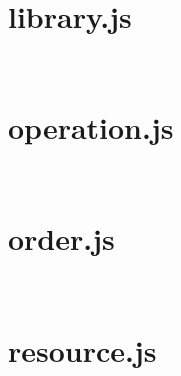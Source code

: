 \begin{lstlisting}[language=bash]

\end{lstlisting}



\section{library.js}



\begin{lstlisting}[language=bash]

\end{lstlisting}



\begin{lstlisting}[language=bash]

\end{lstlisting}


\section{operation.js}




\begin{lstlisting}[language=bash]

\end{lstlisting}



\begin{lstlisting}[language=bash]

\end{lstlisting}



\section{order.js}


\begin{lstlisting}[language=bash]

\end{lstlisting}



\begin{lstlisting}[language=bash]

\end{lstlisting}


\section{resource.js}



